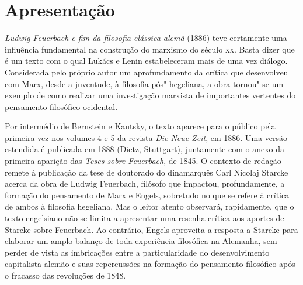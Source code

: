\pagebreak
\thispagestyle{empty}
\movetooddpage
\chapter{Apresentação}


\noindent{}\emph{Ludwig Feuerbach e fim da filosofia clássica alemã} (1886) teve
certamente uma influência fundamental na construção do marxismo do
século \textsc{xx}. Basta dizer que é um texto com o qual Lukács e Lenin
estabeleceram mais de uma vez diálogo. Considerada pelo próprio autor um
aprofundamento da crítica que desenvolveu com Marx, desde a juventude, à
filosofia pós"-hegeliana, a obra tornou"-se um exemplo de como realizar
uma investigação marxista de importantes vertentes do pensamento
filosófico ocidental.

Por intermédio de Bernstein e Kautsky, o texto aparece para o público
pela primeira vez nos volumes 4 e 5 da revista \emph{Die Neue Zeit}, em
1886. Uma versão estendida é publicada em 1888 (Dietz, Stuttgart),
juntamente com o anexo da primeira aparição das \emph{Teses sobre
Feuerbach}, de 1845. O contexto de redação remete à publicação da tese de doutorado do
dinamarquês Carl Nicolaj Starcke acerca da obra de Ludwig Feuerbach,
filósofo que impactou, profundamente, a formação do pensamento de Marx e
Engels, sobretudo no que se refere à crítica de ambos à filosofia
hegeliana. Mas o leitor atento observará, rapidamente, que o texto
engelsiano não se limita a apresentar uma resenha crítica aos aportes de
Starcke sobre Feuerbach. Ao contrário, Engels aproveita a resposta a
Starcke para elaborar um amplo balanço de toda experiência filosófica na
Alemanha, sem perder de vista as imbricações entre a particularidade do
desenvolvimento capitalista alemão e suas repercussões na formação do
pensamento filosófico após o fracasso das revoluções de 1848.

